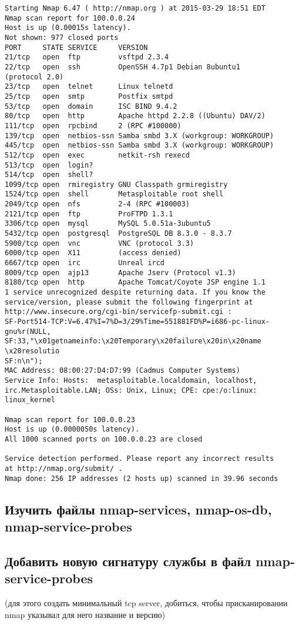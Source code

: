 \documentclass[12pt,a4paper]{article}
\begin{document}
\begin{lstlisting}
Starting Nmap 6.47 ( http://nmap.org ) at 2015-03-29 18:51 EDT
Nmap scan report for 100.0.0.24
Host is up (0.00015s latency).
Not shown: 977 closed ports
PORT     STATE SERVICE     VERSION
21/tcp   open  ftp         vsftpd 2.3.4
22/tcp   open  ssh         OpenSSH 4.7p1 Debian 8ubuntu1 
(protocol 2.0)
23/tcp   open  telnet      Linux telnetd
25/tcp   open  smtp        Postfix smtpd
53/tcp   open  domain      ISC BIND 9.4.2
80/tcp   open  http        Apache httpd 2.2.8 ((Ubuntu) DAV/2)
111/tcp  open  rpcbind     2 (RPC #100000)
139/tcp  open  netbios-ssn Samba smbd 3.X (workgroup: WORKGROUP)
445/tcp  open  netbios-ssn Samba smbd 3.X (workgroup: WORKGROUP)
512/tcp  open  exec        netkit-rsh rexecd
513/tcp  open  login?
514/tcp  open  shell?
1099/tcp open  rmiregistry GNU Classpath grmiregistry
1524/tcp open  shell       Metasploitable root shell
2049/tcp open  nfs         2-4 (RPC #100003)
2121/tcp open  ftp         ProFTPD 1.3.1
3306/tcp open  mysql       MySQL 5.0.51a-3ubuntu5
5432/tcp open  postgresql  PostgreSQL DB 8.3.0 - 8.3.7
5900/tcp open  vnc         VNC (protocol 3.3)
6000/tcp open  X11         (access denied)
6667/tcp open  irc         Unreal ircd
8009/tcp open  ajp13       Apache Jserv (Protocol v1.3)
8180/tcp open  http        Apache Tomcat/Coyote JSP engine 1.1
1 service unrecognized despite returning data. If you know the 
service/version, please submit the following fingerprint at 
http://www.insecure.org/cgi-bin/servicefp-submit.cgi :
SF-Port514-TCP:V=6.47%I=7%D=3/29%Time=551881FD%P=i686-pc-linux-
gnu%r(NULL,
SF:33,"\x01getnameinfo:\x20Temporary\x20failure\x20in\x20name
\x20resolutio
SF:n\n");
MAC Address: 08:00:27:D4:D7:99 (Cadmus Computer Systems)
Service Info: Hosts:  metasploitable.localdomain, localhost, 
irc.Metasploitable.LAN; OSs: Unix, Linux; CPE: cpe:/o:linux:
linux_kernel

Nmap scan report for 100.0.0.23
Host is up (0.0000050s latency).
All 1000 scanned ports on 100.0.0.23 are closed

Service detection performed. Please report any incorrect results
at http://nmap.org/submit/ .
Nmap done: 256 IP addresses (2 hosts up) scanned in 39.96 seconds
\end{lstlisting}
\newpage
\subsection{Изучить файлы nmap-services, nmap-os-db, nmap-service-probes}

\subsection{Добавить новую сигнатуру службы в файл nmap-service-probes}
(для этого создать минимальный tcp server, добиться, чтобы присканировании nmap указывал для него название и версию)
\end{document}
